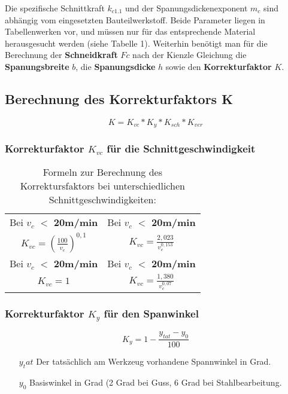 \documentclass[fleqn,10pt]{techReport} %
\begin{document}
\noindent
Die spezifische Schnittkraft $k_{c1.1}$ und der Spanungsdickenexponent $m_c$ sind abhängig vom eingesetzten Bauteilwerkstoff. Beide Parameter liegen in Tabellenwerken vor, und müssen nur für das entsprechende Material herausgesucht werden (siehe Tabelle 1). Weiterhin benötigt man für die Berechnung der \textbf{Schneidkraft} $Fc$ nach der Kienzle Gleichung die \textbf{Spanungsbreite} $b$, die \textbf{Spanungsdicke} $h$ sowie den \textbf{Korrekturfaktor} $K$.

\newpage 
\subsection*{Berechnung des Korrekturfaktors K}

$$K=K_{vc}*K_y*K_{sch}*K_{ver}$$

\subsubsection*{Korrekturfaktor $K_{vc}$ für die Schnittgeschwindigkeit}
    
\begin{table}[H]
\begin{tabular}{|c|c|}
\hline
Bei $v_c$ $<$ \textbf{20m/min} & Bei $v_c$ $<$ \textbf{20m/min} \\
$K_{vc} = \left(\frac{100}{v_c}\right)^{0,1}$ & $K_{vc} = \frac{2,023}{v_c^{0,153}}$ \\
\hline
Bei $v_c$ $<$ \textbf{20m/min} & Bei $v_c$ $<$ \textbf{20m/min} \\
$K_{vc} = 1$ & $K_{vc} = \frac{1,380}{v_c^{0,07}}$ \\
\hline
\end{tabular}
\caption[Korrektursfaktor $K_{vc}$ bei unterschiedlichen Schnittgeschwindigkeiten]{Formeln zur Berechnung des Korrektursfaktors bei unterschiedlichen Schnittgeschwindigkeiten:}
\label{tab:K_vc}
\end{table}

\subsubsection*{Korrekturfaktor $K_y$ für den Spanwinkel}

$$K_y = 1 - \frac{y_{tat}-y_0}{100}$$

\begin{itemize}
\item[$y_tat$] Der tatsächlich am Werkzeug vorhandene Spannwinkel in Grad.
\item[$y_0$] Basiswinkel in Grad (2 Grad bei Guss, 6 Grad bei Stahlbearbeitung.
\end{itemize}
\end{document}
